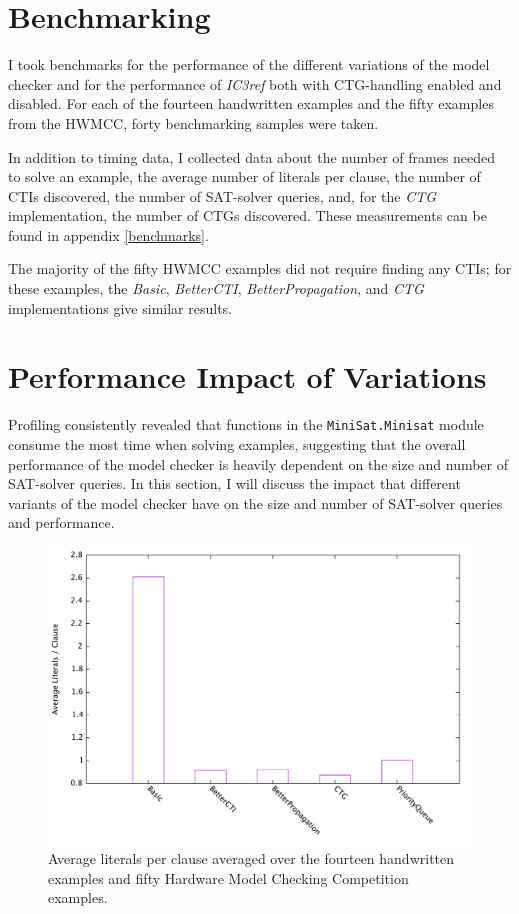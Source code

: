 \documentclass[12pt,a4paper,twoside,openright]{report}
\begin{document}
{\section{Benchmarking}
\label{eval:benchmarking}
I took benchmarks for the performance of the different variations of the model checker and for the
performance of \emph{IC3ref} both with CTG-handling enabled and disabled. For each of the fourteen handwritten examples and the fifty examples from the HWMCC, forty benchmarking samples were taken.

In addition to timing data, I collected data about the number of frames needed to solve an example,
the average number of literals per clause, the number of CTIs discovered, the number of SAT-solver queries,
and, for the \emph{CTG} implementation, the number of CTGs discovered. These measurements can be found in
appendix \ref{benchmarks}.

The majority of the fifty HWMCC examples did not require finding any
CTIs; for these examples, the \emph{Basic}, \emph{BetterCTI}, \emph{BetterPropagation},
and \emph{CTG} implementations give similar results. 

\section{Performance Impact of Variations}
\label{eval:variants}

Profiling consistently revealed that functions in the \verb,MiniSat.Minisat, module consume the most time
when solving examples, suggesting that the overall performance of the model checker is heavily dependent on
the size and number of SAT-solver queries. In this section, I will discuss the impact that different
variants of the model checker have on the size and number of SAT-solver queries and performance.

\begin{figure}[t]
\includegraphics[width=16cm]{litspercls.pdf}
\caption{Average literals per clause averaged over the fourteen handwritten examples and fifty Hardware
Model Checking Competition examples.}
\end{figure}

}
\end{document}
